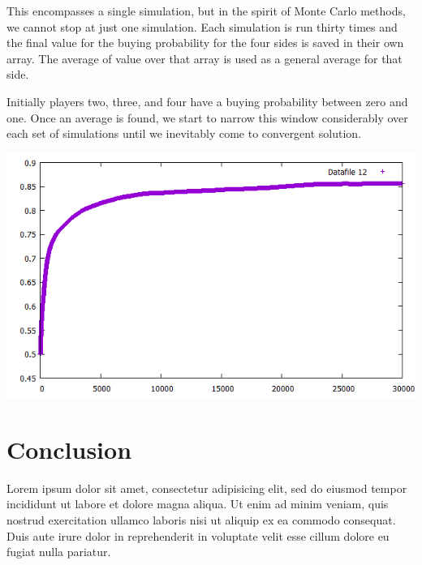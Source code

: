 \documentclass{article}
\begin{document}
This encompasses a single simulation, but in the spirit of Monte Carlo methods, we cannot stop at just one simulation.  Each simulation is run thirty times and the final value for the buying probability for the four sides is saved in their own array.  The average of value over that array is used as a general average for that side.

Initially players two, three, and four have a buying probability between zero and one.  Once an average is found, we start to narrow this window considerably over each set of simulations until we inevitably come to convergent solution.

\begin{center}
\includegraphics[width = \textwidth]{average}
\end{center}

\section{Conclusion}

Lorem ipsum dolor sit amet, consectetur adipisicing elit, sed do eiusmod tempor
incididunt ut labore et dolore magna aliqua. Ut enim ad minim veniam, quis
nostrud exercitation ullamco laboris nisi ut aliquip ex ea commodo consequat.
Duis aute irure dolor in reprehenderit in voluptate velit esse cillum dolore eu
fugiat nulla pariatur.
\end{document}
